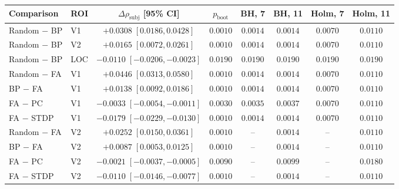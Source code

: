 \begin{tabular}{llcccccc}
\toprule
Comparison & ROI & $\Delta\rho_{\text{subj}}$ [95\% CI] & $p_{\text{boot}}$ & BH, 7 & BH, 11 & Holm, 7 & Holm, 11 \\
\midrule
Random $-$ BP & V1 & $+0.0308\;[0.0186,0.0428]$ & $0.0010$ & $0.0014$ & $0.0014$ & $0.0070$ & $0.0110$ \\
Random $-$ BP & V2 & $+0.0165\;[0.0072,0.0261]$ & $0.0010$ & $0.0014$ & $0.0014$ & $0.0070$ & $0.0110$ \\
Random $-$ BP & LOC & $-0.0110\;[-0.0206,-0.0023]$ & $0.0190$ & $0.0190$ & $0.0190$ & $0.0190$ & $0.0190$ \\
Random $-$ FA & V1 & $+0.0446\;[0.0313,0.0580]$ & $0.0010$ & $0.0014$ & $0.0014$ & $0.0070$ & $0.0110$ \\
BP $-$ FA & V1 & $+0.0138\;[0.0092,0.0186]$ & $0.0010$ & $0.0014$ & $0.0014$ & $0.0070$ & $0.0110$ \\
FA $-$ PC & V1 & $-0.0033\;[-0.0054,-0.0011]$ & $0.0030$ & $0.0035$ & $0.0037$ & $0.0070$ & $0.0110$ \\
FA $-$ STDP & V1 & $-0.0179\;[-0.0229,-0.0130]$ & $0.0010$ & $0.0014$ & $0.0014$ & $0.0070$ & $0.0110$ \\
\midrule
Random $-$ FA & V2 & $+0.0252\;[0.0150,0.0361]$ & $0.0010$ & -- & $0.0014$ & -- & $0.0110$ \\
BP $-$ FA & V2 & $+0.0087\;[0.0053,0.0125]$ & $0.0010$ & -- & $0.0014$ & -- & $0.0110$ \\
FA $-$ PC & V2 & $-0.0021\;[-0.0037,-0.0005]$ & $0.0090$ & -- & $0.0099$ & -- & $0.0180$ \\
FA $-$ STDP & V2 & $-0.0110\;[-0.0146,-0.0077]$ & $0.0010$ & -- & $0.0014$ & -- & $0.0110$ \\
\bottomrule
\end{tabular}
